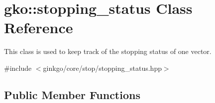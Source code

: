 \hypertarget{classgko_1_1stopping__status}{}\section{gko\+:\+:stopping\+\_\+status Class Reference}
\label{classgko_1_1stopping__status}


This class is used to keep track of the stopping status of one vector.  




{\ttfamily \#include $<$ginkgo/core/stop/stopping\+\_\+status.\+hpp$>$}

\subsection*{Public Member Functions}
